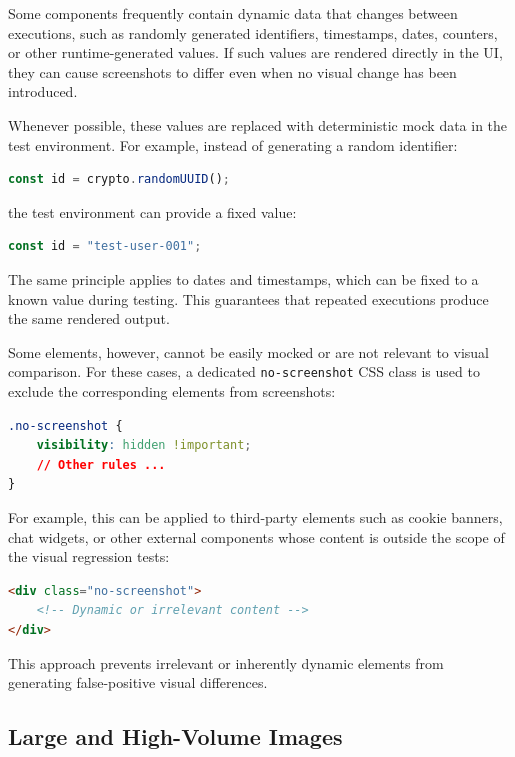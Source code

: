 Some components frequently contain dynamic data that changes between executions, such as randomly generated identifiers, timestamps, dates, counters, or other runtime-generated values. If such values are rendered directly in the \ac{UI}, they can cause screenshots to differ even when no visual change has been introduced.

Whenever possible, these values are replaced with deterministic mock data in the test environment. For example, instead of generating a random identifier:

\begin{lstlisting}[language=typescript]
const id = crypto.randomUUID();
\end{lstlisting}

the test environment can provide a fixed value:

\begin{lstlisting}[language=typescript]
const id = "test-user-001";
\end{lstlisting}

The same principle applies to dates and timestamps, which can be fixed to a known value during testing. This guarantees that repeated executions produce the same rendered output.

Some elements, however, cannot be easily mocked or are not relevant to visual comparison. For these cases, a dedicated \texttt{no-screenshot} CSS class is used to exclude the corresponding elements from screenshots:

\begin{lstlisting}[language=css]
.no-screenshot {
    visibility: hidden !important;
    // Other rules ...
}
\end{lstlisting}

For example, this can be applied to third-party elements such as cookie banners, chat widgets, or other external components whose content is outside the scope of the visual regression tests:

\begin{lstlisting}[language=html]
<div class="no-screenshot">
    <!-- Dynamic or irrelevant content -->
</div>
\end{lstlisting}

This approach prevents irrelevant or inherently dynamic elements from generating false-positive visual differences.

\subsection{Large and High-Volume Images}


